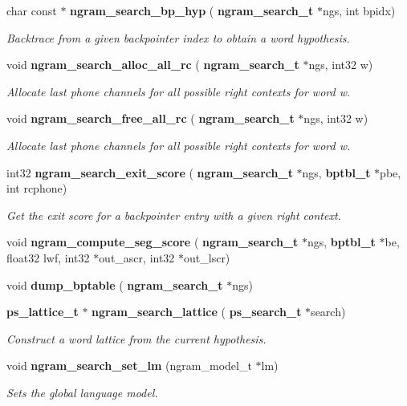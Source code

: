 \begin{DoxyCompactItemize}
char const  $\ast$ \textbf{ ngram\+\_\+search\+\_\+bp\+\_\+hyp} (\textbf{ ngram\+\_\+search\+\_\+t} $\ast$ngs, int bpidx)
\begin{DoxyCompactList}\small\item\em Backtrace from a given backpointer index to obtain a word hypothesis. \end{DoxyCompactList}\item 
\mbox{\label{ngram__search_8c_a1ddcc1a9cb3e164ceb2140097ed23a3e}} 
void \textbf{ ngram\+\_\+search\+\_\+alloc\+\_\+all\+\_\+rc} (\textbf{ ngram\+\_\+search\+\_\+t} $\ast$ngs, int32 w)
\begin{DoxyCompactList}\small\item\em Allocate last phone channels for all possible right contexts for word w. \end{DoxyCompactList}\item 
\mbox{\label{ngram__search_8c_a15477192481dffcb29e9c4167eff6c3c}} 
void \textbf{ ngram\+\_\+search\+\_\+free\+\_\+all\+\_\+rc} (\textbf{ ngram\+\_\+search\+\_\+t} $\ast$ngs, int32 w)
\begin{DoxyCompactList}\small\item\em Allocate last phone channels for all possible right contexts for word w. \end{DoxyCompactList}\item 
\mbox{\label{ngram__search_8c_a25a80e488425b2bd4e24eb753c9295a5}} 
int32 \textbf{ ngram\+\_\+search\+\_\+exit\+\_\+score} (\textbf{ ngram\+\_\+search\+\_\+t} $\ast$ngs, \textbf{ bptbl\+\_\+t} $\ast$pbe, int rcphone)
\begin{DoxyCompactList}\small\item\em Get the exit score for a backpointer entry with a given right context. \end{DoxyCompactList}\item 
\mbox{\label{ngram__search_8c_a7526cf720a80052770c5b6f82c93749d}} 
void {\bfseries ngram\+\_\+compute\+\_\+seg\+\_\+score} (\textbf{ ngram\+\_\+search\+\_\+t} $\ast$ngs, \textbf{ bptbl\+\_\+t} $\ast$be, float32 lwf, int32 $\ast$out\+\_\+ascr, int32 $\ast$out\+\_\+lscr)
\item 
\mbox{\label{ngram__search_8c_ac10e5308e0a48948b3c21bb4c2d80c1b}} 
void {\bfseries dump\+\_\+bptable} (\textbf{ ngram\+\_\+search\+\_\+t} $\ast$ngs)
\item 
\mbox{\label{ngram__search_8c_ac30e7dec4bbfeee9f5163abf4bbd1014}} 
\textbf{ ps\+\_\+lattice\+\_\+t} $\ast$ \textbf{ ngram\+\_\+search\+\_\+lattice} (\textbf{ ps\+\_\+search\+\_\+t} $\ast$search)
\begin{DoxyCompactList}\small\item\em Construct a word lattice from the current hypothesis. \end{DoxyCompactList}\item 
void \textbf{ ngram\+\_\+search\+\_\+set\+\_\+lm} (ngram\+\_\+model\+\_\+t $\ast$lm)
\begin{DoxyCompactList}\small\item\em Sets the global language model. \end{DoxyCompactList}\end{DoxyCompactItemize}


